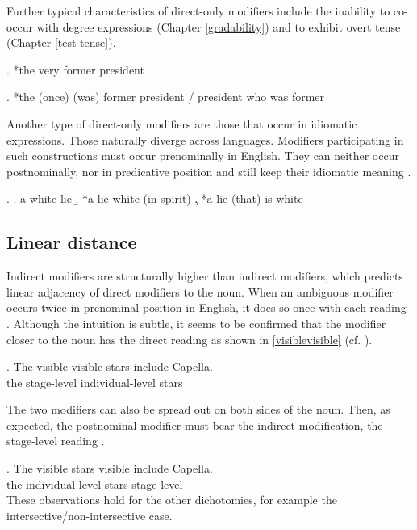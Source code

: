 \documentclass [output=book,colorlinks,citecolor=brown]{langscibook}
\begin{document}
Further typical characteristics of direct-only modifiers include the inability to co-occur with degree expressions (Chapter \ref{gradability}) and to exhibit overt tense (Chapter \ref{test tense}). %

\ex. *the very former president

\ex. *the (once) (was) former president / president who was former

Another type of direct-only modifiers are those that occur in idiomatic expressions. Those naturally diverge across languages. Modifiers participating in such constructions must occur prenominally in English. They can neither occur postnominally, nor in predicative position and still keep their idiomatic meaning \citep[ch. 7.2]{cinque:2010:adj}. %

\ex. \a. a white lie \hfill \citep[88]{cinque:2010:adj}
\b. *a lie white (in spirit)
\c. *a lie (that) is white

\subsection{Linear distance}

Indirect modifiers are structurally higher than indirect modifiers, which predicts linear adjacency of direct modifiers to the noun. When an ambiguous modifier occurs twice in prenominal position in English, it does so once with each reading \citep[19–20]{cinque:2010:adj}. Although the intuition is subtle, it seems to be confirmed that the modifier closer to the noun has the direct reading as shown in \ref{visiblevisible} (cf. \citealt[280–281]{larson:2004:indefinite}).

\exg. The visible visible stars include Capella. \hfill \citep[155]{larson:1998:events}\\
the stage-level individual-level stars\\ \label{visiblevisible}

The two modifiers can also be spread out on both sides of the noun. Then, as expected, the postnominal modifier must bear the indirect modification, the stage-level reading \citep[19–20]{cinque:2010:adj}.

\exg. The visible stars visible include Capella. \null\hfill \citep[155]{larson:1998:events}\\
the individual-level stars stage-level\\

These observations hold for the other dichotomies, for example the intersective/non-intersective case.
\end{document}
